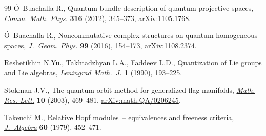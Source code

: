 \documentclass[pdftex]{sigma}
\numberwithin{equation}{section}
\begin{document}
\begin{thebibliography}{99}
\'O~Buachalla R., Quantum bundle description of quantum projective spaces,
 \href{https://doi.org/10.1007/s00220-012-1577-x}{\textit{Comm. Math. Phys.}} \textbf{316} (2012), 345--373, \href{https://arxiv.org/abs/1105.1768}{arXiv:1105.1768}.

\'O~Buachalla R., Noncommutative complex structures on quantum homogeneous
 spaces, \href{https://doi.org/10.1016/j.geomphys.2015.10.003}{\textit{J.~Geom. Phys.}} \textbf{99} (2016), 154--173,
 \href{https://arxiv.org/abs/1108.2374}{arXiv:1108.2374}.

Reshetikhin N.Yu., Takhtadzhyan L.A., Faddeev L.D., Quantization of {L}ie groups
 and {L}ie algebras, \textit{Leningrad Math.~J.} \textbf{1} (1990), 193--225.

Stokman J.V., The quantum orbit method for generalized flag manifolds,
 \href{https://doi.org/10.4310/MRL.2003.v10.n4.a6}{\textit{Math. Res. Lett.}} \textbf{10} (2003), 469--481,
 \href{https://arxiv.org/abs/math.QA/0206245}{arXiv:math.QA/0206245}.

Takeuchi M., Relative {H}opf modules~-- equivalences and freeness criteria,
 \href{https://doi.org/10.1016/0021-8693(79)90093-0}{\textit{J.~Algebra}} \textbf{60} (1979), 452--471.

\end{thebibliography}\LastPageEnding
\end{document}
